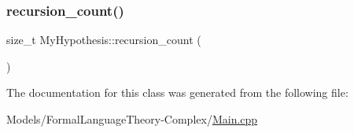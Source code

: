 \subsubsection{\texorpdfstring{recursion\+\_\+count()}{recursion\_count()}}
{\footnotesize\ttfamily size\+\_\+t My\+Hypothesis\+::recursion\+\_\+count (\begin{DoxyParamCaption}{ }\end{DoxyParamCaption})\hspace{0.3cm}{\ttfamily [inline]}}



The documentation for this class was generated from the following file\+:\begin{DoxyCompactItemize}
\item 
Models/\+Formal\+Language\+Theory-\/\+Complex/\hyperlink{_models_2_formal_language_theory-_complex_2main_8cpp}{Main.\+cpp}\end{DoxyCompactItemize}
